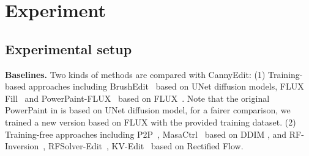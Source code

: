 \documentclass{article}
\begin{document}








\section{Experiment}
\label{Sec:experiment}


\subsection{Experimental setup}

\textbf{Baselines.} Two kinds of methods are compared with CannyEdit: (1) Training-based approaches including BrushEdit~\cite{li2024brushedit} based on UNet diffusion models, FLUX Fill~\cite{blackforest2024FLUX} and PowerPaint-FLUX~\cite{zhuang2023task} based on FLUX~\cite{blackforest2024FLUX}. Note that the original PowerPaint in \cite{blackforest2024FLUX} is based on UNet diffusion model, for a fairer comparison, we trained a new version based on FLUX with the provided training dataset. (2) Training-free approaches including P2P~\cite{hertz2022prompt}, MasaCtrl~\cite{cao2023masactrl} based on DDIM \citep{song2022denoisingdiffusionimplicitmodels}, and RF-Inversion~\cite{rout2024semantic}, RFSolver-Edit~\cite{wang2024taming}, KV-Edit~\cite{zhu2025kv} based on Rectified
Flow. %
\end{document}
